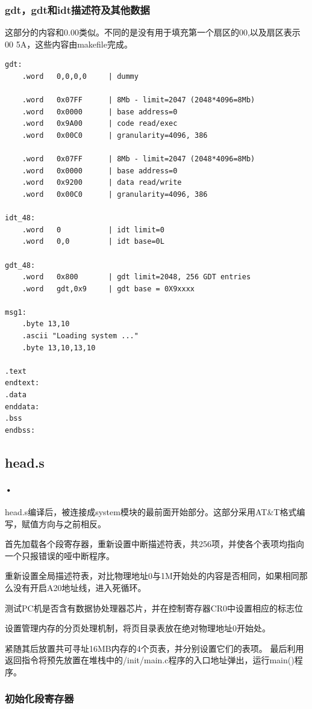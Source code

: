 \documentclass[12pt]{article}
\begin{document}
\subsubsection{gdt，gdt和idt描述符及其他数据}	
这部分的内容和0.00类似。不同的是没有用于填充第一个扇区的00,以及扇区表示00 5A，这些内容由makefile完成。
\begin{lstlisting}[breaklines]
gdt:
	.word	0,0,0,0		| dummy

	.word	0x07FF		| 8Mb - limit=2047 (2048*4096=8Mb)
	.word	0x0000		| base address=0
	.word	0x9A00		| code read/exec
	.word	0x00C0		| granularity=4096, 386

	.word	0x07FF		| 8Mb - limit=2047 (2048*4096=8Mb)
	.word	0x0000		| base address=0
	.word	0x9200		| data read/write
	.word	0x00C0		| granularity=4096, 386

idt_48:
	.word	0			| idt limit=0
	.word	0,0			| idt base=0L

gdt_48:
	.word	0x800		| gdt limit=2048, 256 GDT entries
	.word	gdt,0x9		| gdt base = 0X9xxxx
	
msg1:
	.byte 13,10
	.ascii "Loading system ..."
	.byte 13,10,13,10

.text
endtext:
.data
enddata:
.bss
endbss:
\end{lstlisting}
\subsection{head.s}
\paragraph{•}
head.s编译后，被连接成system模块的最前面开始部分。这部分采用AT\&T格式编写，赋值方向与之前相反。
\begin{list}{•}{•}
\item 首先加载各个段寄存器，重新设置中断描述符表，共256项，并使各个表项均指向一个只报错误的哑中断程序。
\item 重新设置全局描述符表，对比物理地址0与1M开始处的内容是否相同，如果相同那么没有开启A20地址线，进入死循环。
\item 测试PC机是否含有数据协处理器芯片，并在控制寄存器CR0中设置相应的标志位
\item 设置管理内存的分页处理机制，将页目录表放在绝对物理地址0开始处。
\item 紧随其后放置共可寻址16MB内存的4个页表，并分别设置它们的表项。
最后利用返回指令将预先放置在堆栈中的/init/main.c程序的入口地址弹出，运行main()程序。
\end{list}
\subsubsection{初始化段寄存器}	
\end{document}
